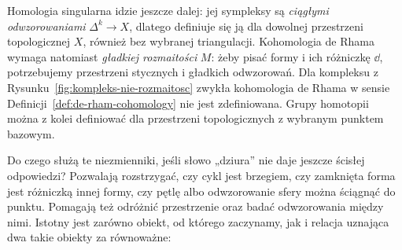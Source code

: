 Homologia singularna idzie jeszcze dalej: jej
sympleksy są \emph{ciągłymi odwzorowaniami}
$\Delta^k\to X$, dlatego definiuje się ją
dla dowolnej przestrzeni topologicznej $X$,
również bez wybranej triangulacji. Kohomologia
de Rhama wymaga natomiast \emph{gładkiej
rozmaitości} $M$: żeby pisać formy i ich
różniczkę $\dd$, potrzebujemy przestrzeni
stycznych i gładkich odwzorowań. Dla kompleksu
z Rysunku~\ref{fig:kompleks-nie-rozmaitosc}
zwykła kohomologia de Rhama w sensie
Definicji~\ref{def:de-rham-cohomology}
nie jest zdefiniowana. Grupy homotopii
można z kolei definiować dla przestrzeni
topologicznych z wybranym punktem bazowym.

Do czego służą te niezmienniki, jeśli słowo
„dziura” nie daje jeszcze ścisłej odpowiedzi?
Pozwalają rozstrzygać, czy cykl jest brzegiem,
czy zamknięta forma jest różniczką innej formy,
czy pętlę albo odwzorowanie sfery można
ściągnąć do punktu. Pomagają też odróżnić
przestrzenie oraz badać odwzorowania między nimi.
Istotny jest zarówno obiekt, od którego
zaczynamy, jak i relacja uznająca dwa takie
obiekty za równoważne:

